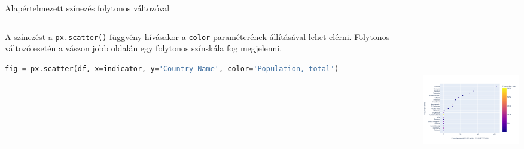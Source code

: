 \documentclass[english, aspectratio=169]{beamer}
\begin{document}
\begin{frame}[fragile]{Alapértelmezett színezés folytonos változóval}
	\begin{columns}
		\begin{column}{.5\textwidth}
			A színezést a \texttt{px.scatter()} függvény hívásakor a \texttt{color} paraméterének állításával lehet elérni. Folytonos változó esetén a vászon jobb oldalán egy folytonos színskála fog megjelenni.\par\medskip
			\begin{lstlisting}[language=python]
fig = px.scatter(df, x=indicator, y='Country Name', color='Population, total')				
			\end{lstlisting}
		\end{column}
		\begin{column}{.5\textwidth}
			\begin{center}
				\includegraphics[width=7cm, height=7cm, keepaspectratio]{images/scatter_9.png}
			\end{center}
		\end{column}
	\end{columns}
\end{frame}
\end{document}
